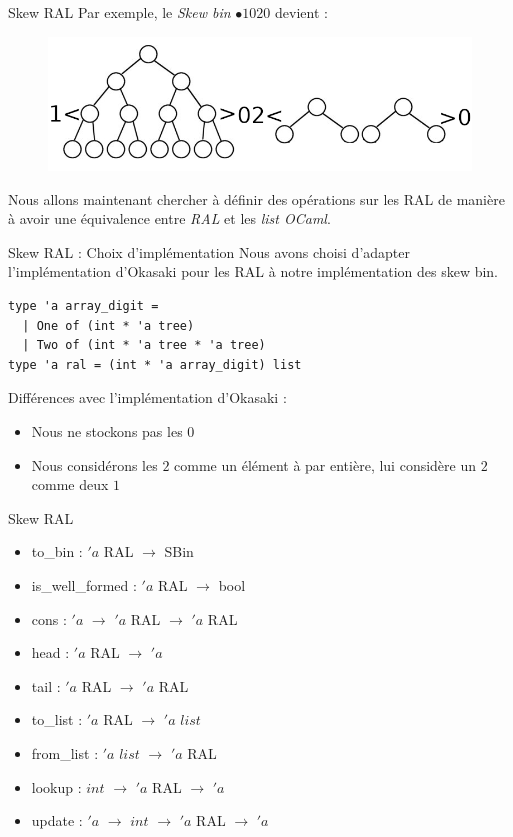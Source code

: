 \documentclass{beamer}
\begin{document}
\begin{frame}{Skew RAL}
Par exemple, le \textit{Skew bin} $\bullet 1020$ devient : \\
    \begin{figure}
    \centering
   \includegraphics[width=\textwidth]{exemple_ral.png}
\end{figure}

Nous allons maintenant chercher à définir des opérations sur les RAL de manière à avoir une équivalence entre \textit{RAL} et les \textit{list OCaml}.
\end{frame}

\begin{frame}[fragile]{Skew RAL : Choix d'implémentation}
Nous avons choisi d'adapter l'implémentation d'Okasaki pour les RAL à notre implémentation des skew bin.

\begin{lstlisting}
type 'a array_digit =
  | One of (int * 'a tree)
  | Two of (int * 'a tree * 'a tree)
type 'a ral = (int * 'a array_digit) list
\end{lstlisting}

Différences avec l'implémentation d'Okasaki :
\begin{itemize}
    \item Nous ne stockons pas les $0$
    \item Nous considérons les $2$ comme un élément à par entière, lui considère un $2$ comme deux $1$
\end{itemize}

    
\end{frame}

\begin{frame}{Skew RAL}
\begin{itemize}
    \item to\_bin : $'a$ RAL $\rightarrow$ SBin
    \item is\_well\_formed : $'a$ RAL $\rightarrow$ bool
    \item cons : $'a$ $\rightarrow$ $'a$ RAL $\rightarrow$ $'a$ RAL
    \item head : $'a$ RAL $\rightarrow$ $'a$
    \item tail : $'a$ RAL $\rightarrow$ $'a$ RAL
    \item  to\_list : $'a$ RAL $\rightarrow$ $'a$ $list$
    \item from\_list : $'a$ $list$ $\rightarrow$ $'a$ RAL
    \item lookup : $int$ $\rightarrow$ $'a$ RAL $\rightarrow$ $'a$
    \item update : $'a$ $\rightarrow$ $int$ $\rightarrow$ $'a$ RAL $\rightarrow$ $'a$
\end{itemize}

    
\end{frame}
\end{document}
